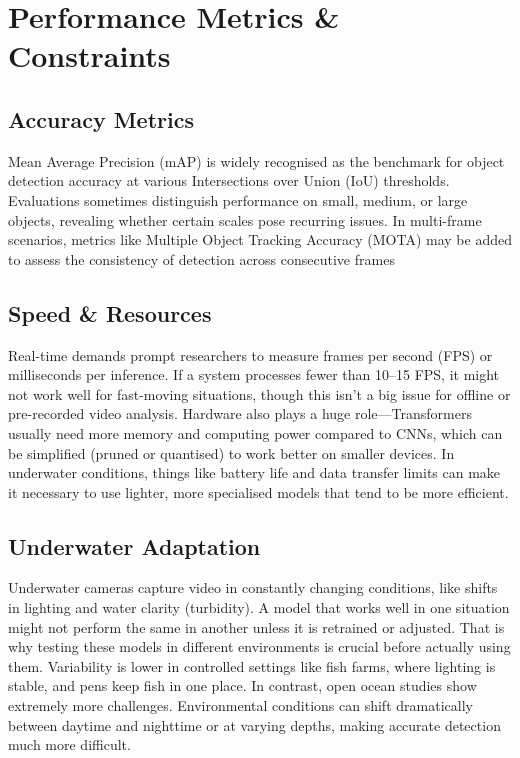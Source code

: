 \section{Performance Metrics \& Constraints}
\subsection{Accuracy Metrics}
Mean Average Precision (mAP) is widely recognised as the benchmark for object detection accuracy at various Intersections over Union (IoU) thresholds. Evaluations sometimes distinguish performance on small, medium, or large objects, revealing whether certain scales pose recurring issues. In multi-frame scenarios, metrics like Multiple Object Tracking Accuracy (MOTA) may be added to assess the consistency of detection across consecutive frames
\subsection{Speed \& Resources}
Real-time demands prompt researchers to measure frames per second (FPS) or milliseconds per inference. If a system processes fewer than 10–15 FPS, it might not work well for fast-moving situations, though this isn’t a big issue for offline or pre-recorded video analysis. Hardware also plays a huge role—Transformers usually need more memory and computing power compared to CNNs, which can be simplified (pruned or quantised) to work better on smaller devices. In underwater conditions, things like battery life and data transfer limits can make it necessary to use lighter, more specialised models that tend to be more efficient.
\subsection{Underwater Adaptation}
Underwater cameras capture video in constantly changing conditions, like shifts in lighting and water clarity (turbidity). A model that works well in one situation might not perform the same in another unless it is retrained or adjusted. That is why testing these models in different environments is crucial before actually using them. Variability is lower in controlled settings like fish farms, where lighting is stable, and pens keep fish in one place. In contrast, open ocean studies show extremely more challenges. Environmental conditions can shift dramatically between daytime and nighttime or at varying depths, making accurate detection much more difficult.
